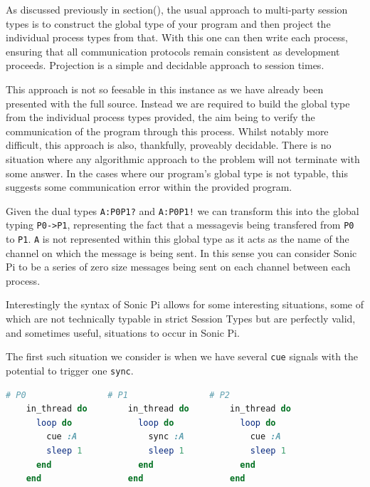 \documentclass[11pt]{scrartcl}
\begin{document}

As discussed previously in section(), the usual approach to multi-party session 
types is to construct the global type of your program and then project the 
individual process types from that. With this one can then write each process, 
ensuring that all communication protocols remain consistent as development 
proceeds. Projection is a simple and decidable approach to session times.

This approach is not so feesable in this instance as we have already been 
presented with the full source. Instead we are required to build the global
type from the individual process types provided, the aim being to verify
the communication of the program through this process. Whilst notably more
difficult, this approach is also, thankfully, proveably decidable. There is
no situation where any algorithmic approach to the problem will not terminate
with some answer. In the cases where our program's global type is not
typable, this suggests some communication error within the provided program.

Given the dual types \texttt{A:P0P1?} and \texttt{A:P0P1!} we can transform 
this into the global typing \texttt{P0->P1}, representing the fact that a 
messagevis being transfered from \texttt{P0} to \texttt{P1}. \texttt{A} is not
represented within this global type as it acts as the name of the channel on
which the message is being sent. In this sense you can consider Sonic Pi
to be a series of zero size messages being sent on each channel between
each process.

Interestingly the syntax of Sonic Pi allows for some interesting situations,
some of which are not technically typable in strict Session Types but are
perfectly valid, and sometimes useful, situations to occur in Sonic Pi.

The first such situation we consider is when we have several \texttt{cue}
signals with the potential to trigger one \texttt{sync}.

\begin{minipage}{\textwidth}
	\begin{lstlisting}[language = ruby]
    # P0                # P1                # P2
    in_thread do        in_thread do        in_thread do
      loop do             loop do             loop do
        cue :A              sync :A             cue :A
        sleep 1             sleep 1             sleep 1
      end                 end                 end
    end                 end                 end
	\end{lstlisting}
\end{minipage}
\end{document}
